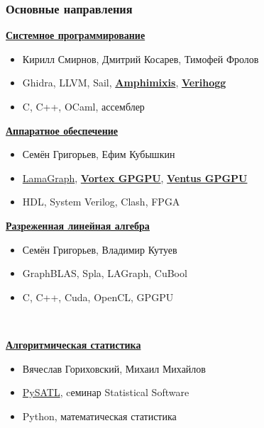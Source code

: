 \documentclass[xcolor=table,aspectratio=169]{beamer}
\begin{document}
\begin{frame}[fragile]
  \frametitle{Основные направления}
  \begin{minipage}{0.48\textwidth}
      \underline{\textbf{Системное программирование}}
      \small{
        \begin{itemize}\setlength\itemsep{-0.4em}
          \item Кирилл Смирнов, Дмитрий Косарев, Тимофей Фролов
          \item Ghidra, LLVM, Sail, \textbf{\href{https://github.com/Amphimixis/amphimixis}{Amphimixis}}, \textbf{\href{https://github.com/verihogg}{Verihogg}}
          \item C, C++, OCaml, ассемблер
        \end{itemize}
      }
        \underline{\textbf{Аппаратное обеспечение}}
        \small{
        \begin{itemize}\setlength\itemsep{-0.4em}
          \item Семён Григорьев, Ефим Кубышкин
          \item \href{https://github.com/Lamagraph}{LamaGraph}, \textbf{\href{https://github.com/vortexgpgpu/vortex}{Vortex GPGPU}}, \textbf{\href{https://github.com/THU-DSP-LAB/ventus-gpgpu}{Ventus GPGPU}}
          \item HDL, System Verilog, Clash, FPGA
        \end{itemize}
        }
        \underline{\textbf{\href{https://github.com/SparseLinearAlgebra}{Разреженная линейная алгебра}}}
        \small{
        \begin{itemize}\setlength\itemsep{-0.4em}
          \item Семён Григорьев, Владимир Кутуев
          \item GraphBLAS, Spla, LAGraph, CuBool
          \item C, C++, Cuda, OpenCL, GPGPU
        \end{itemize}
        }      
    \end{minipage}~  
  \begin{minipage}{0.48\textwidth}
        \underline{\textbf{Алгоритмическая статистика}}
        \small{
        \begin{itemize}\setlength\itemsep{-0.4em}
          \item Вячеслав Гориховский, Михаил Михайлов
          \item \href{https://github.com/PySATL/}{PySATL}, cеминар Statistical Software
          \item Python, математическая статистика

\end{itemize}}
\end{minipage}
\end{frame}
\end{document}
